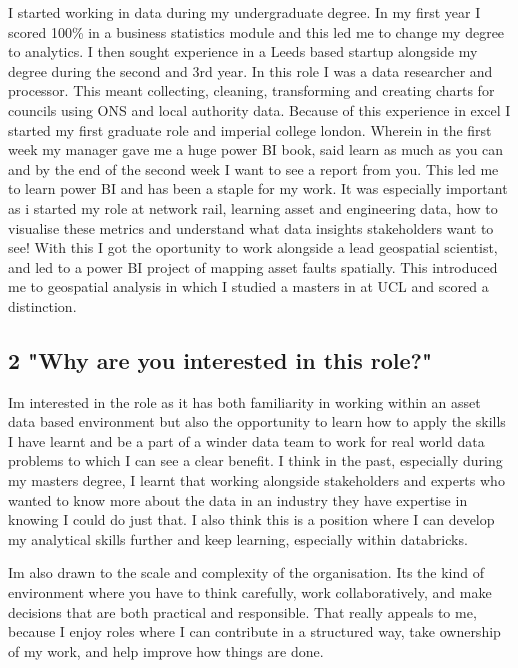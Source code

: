 \documentclass[
  letterpaper,
]{scrbook}
\begin{document}
I started working in data during my undergraduate degree. In my first
year I scored 100\% in a business statistics module and this led me to
change my degree to analytics. I then sought experience in a Leeds based
startup alongside my degree during the second and 3rd year. In this role
I was a data researcher and processor. This meant collecting, cleaning,
transforming and creating charts for councils using ONS and local
authority data. Because of this experience in excel I started my first
graduate role and imperial college london. Wherein in the first week my
manager gave me a huge power BI book, said learn as much as you can and
by the end of the second week I want to see a report from you. This led
me to learn power BI and has been a staple for my work. It was
especially important as i started my role at network rail, learning
asset and engineering data, how to visualise these metrics and
understand what data insights stakeholders want to see! With this I got
the oportunity to work alongside a lead geospatial scientist, and led to
a power BI project of mapping asset faults spatially. This introduced me
to geospatial analysis in which I studied a masters in at UCL and scored
a distinction.

\subsection{2 "Why are you interested in this
role?"}\label{why-are-you-interested-in-this-role}

Im interested in the role as it has both familiarity in working within
an asset data based environment but also the opportunity to learn how to
apply the skills I have learnt and be a part of a winder data team to
work for real world data problems to which I can see a clear benefit. I
think in the past, especially during my masters degree, I learnt that
working alongside stakeholders and experts who wanted to know more about
the data in an industry they have expertise in knowing I could do just
that. I also think this is a position where I can develop my analytical
skills further and keep learning, especially within databricks.

I\textquotesingle m also drawn to the scale and complexity of the
organisation. It\textquotesingle s the kind of environment where you
have to think carefully, work collaboratively, and make decisions that
are both practical and responsible. That really appeals to me, because I
enjoy roles where I can contribute in a structured way, take ownership
of my work, and help improve how things are done.
\end{document}
